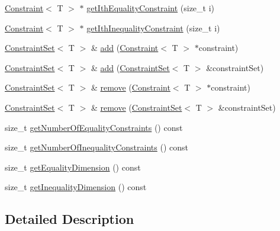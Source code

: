 \begin{DoxyCompactItemize}
\item 
\hyperlink{classocra_1_1Constraint}{Constraint}$<$ T $>$ $\ast$ \hyperlink{classocra_1_1ConstraintSet_a5b7d67d57cc92ade65d84fe36d94bbe0}{get\+Ith\+Equality\+Constraint} (size\+\_\+t i)
\item 
\hyperlink{classocra_1_1Constraint}{Constraint}$<$ T $>$ $\ast$ \hyperlink{classocra_1_1ConstraintSet_af0de2bdd6267da2c53e7c9b3045dfb74}{get\+Ith\+Inequality\+Constraint} (size\+\_\+t i)
\item 
\hyperlink{classocra_1_1ConstraintSet}{Constraint\+Set}$<$ T $>$ \& \hyperlink{classocra_1_1ConstraintSet_a56204ca335c5e235629cfbc8d68397ac}{add} (\hyperlink{classocra_1_1Constraint}{Constraint}$<$ T $>$ $\ast$constraint)
\item 
\hyperlink{classocra_1_1ConstraintSet}{Constraint\+Set}$<$ T $>$ \& \hyperlink{classocra_1_1ConstraintSet_a4e0ff725278438f2f595ebc0a5de4389}{add} (\hyperlink{classocra_1_1ConstraintSet}{Constraint\+Set}$<$ T $>$ \&constraint\+Set)
\item 
\hyperlink{classocra_1_1ConstraintSet}{Constraint\+Set}$<$ T $>$ \& \hyperlink{classocra_1_1ConstraintSet_a6f0c43b34ff1ea60911a10186c66f294}{remove} (\hyperlink{classocra_1_1Constraint}{Constraint}$<$ T $>$ $\ast$constraint)
\item 
\hyperlink{classocra_1_1ConstraintSet}{Constraint\+Set}$<$ T $>$ \& \hyperlink{classocra_1_1ConstraintSet_a78f8d0f6f919734bb915bf6f63f5f058}{remove} (\hyperlink{classocra_1_1ConstraintSet}{Constraint\+Set}$<$ T $>$ \&constraint\+Set)
\item 
size\+\_\+t \hyperlink{classocra_1_1ConstraintSet_afc920f5ab47e77b1e8770fc010cf29eb}{get\+Number\+Of\+Equality\+Constraints} () const 
\item 
size\+\_\+t \hyperlink{classocra_1_1ConstraintSet_a36ca28bed7bf07248e40af827582a015}{get\+Number\+Of\+Inequality\+Constraints} () const 
\item 
size\+\_\+t \hyperlink{classocra_1_1ConstraintSet_acf471cd9f78686fa1d92ae1a60ec40a0}{get\+Equality\+Dimension} () const 
\item 
size\+\_\+t \hyperlink{classocra_1_1ConstraintSet_aece0405597a786874625fb35c4ce35d7}{get\+Inequality\+Dimension} () const 
\end{DoxyCompactItemize}



\subsection{Detailed Description}

